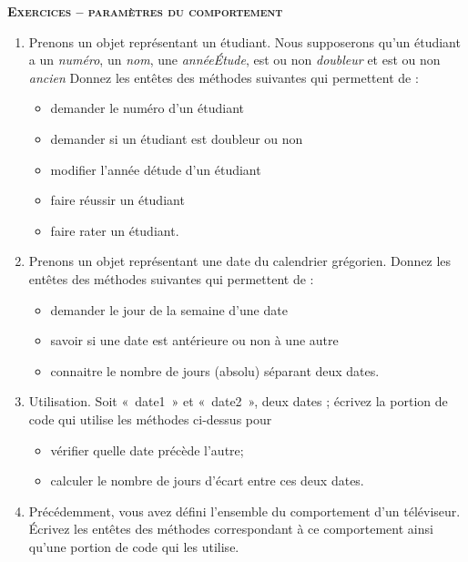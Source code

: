 
\bigskip

{\sffamily\bfseries\scshape
Exercices – paramètres du comportement}

\liststyleWWviiiNumi
\begin{enumerate}
	\item 
		Prenons un objet représentant un étudiant. 
		Nous supposerons qu'un étudiant a un \textit{numéro}, un 
		\textit{nom}, une \textit{annéeÉtude}, est ou non 
		\textit{doubleur} et est ou non \textit{ancien}
		Donnez les entêtes des méthodes suivantes qui permettent de
		:

		\liststyleListv
		\begin{itemize}
			\item 
				demander le numéro d'un étudiant
			\item 
				demander si un étudiant est doubleur ou non
			\item 
				modifier l'année détude d'un étudiant
			\item 
				faire réussir un étudiant
			\item 
				faire rater un étudiant.
		\end{itemize}
			
	\item 
		Prenons un objet représentant une date du calendrier grégorien. 
		Donnez les entêtes des méthodes suivantes qui permettent de
		:

		\liststyleListv
		\begin{itemize}
			\item
				demander le jour de la semaine d'une date
			\item 
				savoir si une date est antérieure ou non à une autre
			\item 
				connaitre le nombre de jours (absolu) séparant deux dates.
		\end{itemize}
		
	\item 
		Utilisation. Soit «~date1~» et «~date2~», deux dates ; écrivez la
		portion de code qui utilise les méthodes ci-dessus pour
		
		\liststyleListv
		\begin{itemize}
			\item 
				vérifier quelle date précède l'autre;
			\item 
				calculer le nombre de jours d'écart entre ces deux
				dates.
		\end{itemize}
	
	\item 
		Précédemment, vous avez défini l'ensemble du
		comportement d'un téléviseur. Écrivez les entêtes des
		méthodes correspondant à ce comportement ainsi qu'une
		portion de code qui les utilise.
\end{enumerate}

